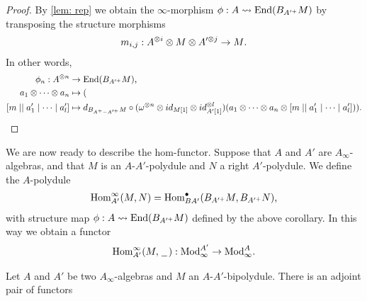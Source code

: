 \documentclass[../thesis.tex]{subfiles}
\begin{document}
            \begin{proof}
                By \ref{lem: rep} we obtain the $\infty$-morphism $\phi : A \rightsquigarrow \tt{End}(B_{A'^+}M)$ by transposing the structure morphisms
                \begin{align*}
                    m_{i,j} : A^{\otimes i} \otimes M \otimes A'^{\otimes j} \rightarrow M\tt{.}
                \end{align*}
                In other words,
                \begin{align*}
                    \phi_n : A^{\otimes n} & \rightarrow \tt{End}(B_{A'^+}M)\tt{,} \\
                    a_1 \otimes \cdots \otimes a_n & \mapsto (\\
                    [m \mid\mid a'_1 \mid \cdots \mid a'_l] & \mapsto d_{B_{A^+-A'^+}M}\circ (\omega^{\otimes n}\otimes id_{M[1]} \otimes id_{A'[1]}^{\otimes l}) (a_1 \otimes \cdots \otimes a_n \otimes [m \mid\mid a'_1 \mid \cdots \mid a'_l]))\tt{.}
                \end{align*}
            \end{proof}

            We are now ready to describe the hom-functor. Suppose that $A$ and $A'$ are $A_\infty$-algebras, and that $M$ is an $A$-$A'$-polydule and $N$ a right $A'$-polydule. We define the $A$-polydule
            \begin{align*}
                \tt{Hom}^\infty_{A'}(M,N) = \tt{Hom}_{BA'}^\bullet(B_{A'^+}M,B_{A'^+}N)\tt{,}
            \end{align*}
            with structure map $\phi : A \rightsquigarrow \tt{End}(B_{A'^+}M)$ defined by the above corollary. In this way we obtain a functor
            \begin{align*}
                \tt{Hom}^\infty_{A'}(M,\argument) : \tt{Mod}_\infty^{A'} \rightarrow \tt{Mod}_\infty^A\tt{.}
            \end{align*}

            \begin{lemma}
                Let $A$ and $A'$ be two $A_\infty$-algebras and $M$ an $A$-$A'$-bipolydule. There is an adjoint pair of functors
                \begin{center}
                \end{center}
            \end{lemma}
\end{document}
